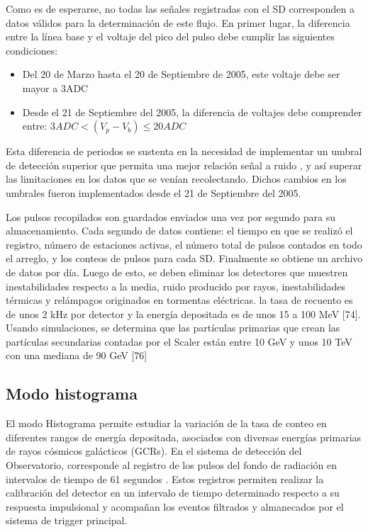 Como es de esperarse, no todas las señales registradas con el SD corresponden a datos válidos para la determinación de este flujo. En primer lugar, la diferencia entre la línea base y el voltaje del pico del pulso debe cumplir las siguientes condiciones:

\begin{itemize}
    \item Del 20 de Marzo hasta el 20 de Septiembre de 2005, este voltaje debe ser mayor a 3ADC
    \item Desde el 21 de Septiembre del 2005, la diferencia de voltajes debe comprender entre: $3ADC < (V_{p}-V_{b}) \leq 20ADC $
\end{itemize}

Esta diferencia de periodos se sustenta en la necesidad de implementar un umbral de detección superior que permita una mejor relación señal a ruido \cite{GAP_2005}, y así superar las limitaciones en los datos que se venían recolectando. Dichos cambios en los umbrales fueron implementados desde el 21 de Septiembre del 2005.

Los pulsos recopilados son guardados enviados una vez por segundo para su almacenamiento. Cada segundo de datos contiene: el tiempo en que se realizó el registro, número de estaciones activas, el número total de pulsos contados en todo el arreglo, y los conteos de pulsos para cada SD. Finalmente se obtiene un archivo de datos por día. Luego de esto, se deben eliminar los detectores que muestren inestabilidades respecto a la media, ruido producido por rayos, inestabilidades térmicas y relámpagos originados en tormentas eléctricas.  la tasa de recuento es de unos 2 kHz por detector y la energía depositada es de unos 15 a 100 MeV [74]. Usando simulaciones, se determina que las partículas primarias que crean las partículas secundarias contadas por el Scaler están entre 10 GeV y unos 10 TeV con una mediana de 90 GeV [76]

\subsection{Modo histograma}

El modo Histograma permite estudiar la variación de la tasa de conteo en diferentes rangos de energía depositada, asociados con diversas energías primarias de rayos cósmicos galácticos (GCRs). En el sistema de detección del Observatorio, corresponde al registro de los pulsos del fondo de radiación en intervalos de tiempo de 61 segundos \cite{asorey} . Estos registros permiten realizar la calibración del detector en un intervalo de tiempo determinado respecto a su respuesta impulsional y acompañan los eventos filtrados y almanecados por el sistema de trigger principal. 

